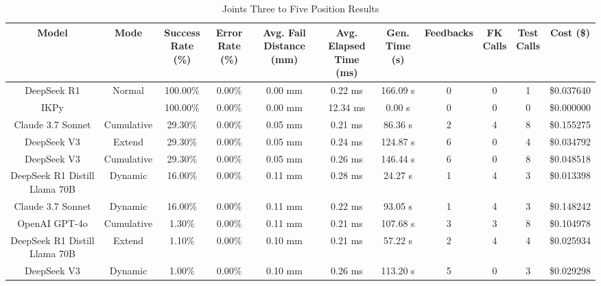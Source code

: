 \begin{table}[H]
\tiny
\renewcommand{\arraystretch}{1.2}
\caption{Joints Three to Five Position Results}
\begin{center}
\begin{tabular}{|c|c|c|c|c|c|c|c|c|c|c|}
    \hline
    \textbf{Model} & 
    \textbf{Mode} & 
    \makecell{\textbf{Success}\\\textbf{Rate (\%)}} &
    \makecell{\textbf{Error}\\\textbf{Rate (\%)}} &
    \makecell{\textbf{Avg. Fail}\\\textbf{Distance (mm)}} &
    \makecell{\textbf{Avg. Elapsed}\\\textbf{Time (ms)}} &
    \makecell{\textbf{Gen.}\\\textbf{Time (s)}} &
    \textbf{Feedbacks} &
    \makecell{\textbf{FK}\\\textbf{Calls}} &
    \makecell{\textbf{Test}\\\textbf{Calls}} &
    \textbf{Cost (\$)} \\
    \hline
    DeepSeek R1 & Normal & 100.00\% & 0.00\% & 0.00 mm & 0.22 ms & 166.09 s & 0 & 0 & 1 & \$0.037640 \\
    \hline
    IKPy &  & 100.00\% & 0.00\% & 0.00 mm & 12.34 ms & 0.00 s & 0 & 0 & 0 & \$0.000000 \\
    \hline
    Claude 3.7 Sonnet & Cumulative & 29.30\% & 0.00\% & 0.05 mm & 0.21 ms & 86.36 s & 2 & 4 & 8 & \$0.155275 \\
    \hline
    DeepSeek V3 & Extend & 29.30\% & 0.00\% & 0.05 mm & 0.24 ms & 124.87 s & 6 & 0 & 4 & \$0.034792 \\
    \hline
    DeepSeek V3 & Cumulative & 29.30\% & 0.00\% & 0.05 mm & 0.26 ms & 146.44 s & 6 & 0 & 8 & \$0.048518 \\
    \hline
    DeepSeek R1 Distill Llama 70B & Dynamic & 16.00\% & 0.00\% & 0.11 mm & 0.28 ms & 24.27 s & 1 & 4 & 3 & \$0.013398 \\
    \hline
    Claude 3.7 Sonnet & Dynamic & 16.00\% & 0.00\% & 0.11 mm & 0.22 ms & 93.05 s & 1 & 4 & 3 & \$0.148242 \\
    \hline
    OpenAI GPT-4o & Cumulative & 1.30\% & 0.00\% & 0.11 mm & 0.21 ms & 107.68 s & 3 & 3 & 8 & \$0.104978 \\
    \hline
    DeepSeek R1 Distill Llama 70B & Extend & 1.10\% & 0.00\% & 0.10 mm & 0.21 ms & 57.22 s & 2 & 4 & 4 & \$0.025934 \\
    \hline
    DeepSeek V3 & Dynamic & 1.00\% & 0.00\% & 0.10 mm & 0.26 ms & 113.20 s & 5 & 0 & 3 & \$0.029298 \\

\end{tabular}
\end{center}
\end{table}
